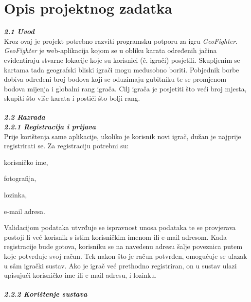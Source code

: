 \chapter{Opis projektnog zadatka}
		
		\textbf{\textit{\large 2.1 Uvod}}\\
		
		{Kroz ovaj je projekt potrebno razviti programsku potporu za igru  \emph{GeoFighter}. \emph{GeoFighter} je web-aplikacija kojom se u obliku karata određenih jačina evidentiraju stvarne lokacije koje su korisnici (č. igrači) posjetili. Skupljenim se kartama tada geografski bliski igrači mogu međusobno boriti. Pobjednik borbe dobiva određeni broj bodova koji se oduzimaju gubitniku te se promjenom bodova mijenja i globalni rang igrača. Cilj igrača je posjetiti što veći broj mjesta, skupiti što više karata i postići što bolji rang. } \\ \\
		
		
		\textbf{\textit{\large 2.2 Razrada }}\\ 
		
		\textbf{\textit{2.2.1 Registracija i prijava }}\\
		
		{Prije korištenja same aplikacije, ukoliko je korisnik novi igrač, dužan je najprije registrirati se. Za registraciju potrebni su:}
	
		\begin{packed_item}
			\item {korisničko ime,}
			\item {fotografija,}
			\item {lozinka,}
			\item {e-mail adresa.}
		\end{packed_item}
		
		{Validacijom podataka utvrđuje se ispravnost unosa podataka te se provjerava postoji li već korisnik s istim korisničkim imenom ili e-mail adresom. Kada registracije bude gotova, korisniku se na navedenu adresu šalje poveznica putem koje potvrđuje svoj račun. Tek nakon što je račun potvrđen, omogućuje se ulazak u sâm igrački sustav.}
		{Ako je igrač već prethodno registriran, on u sustav ulazi upisujući korisničko ime ili e-mail adresu, i lozinku.}\\ \\
		
		\textbf{\textit{2.2.2 Korištenje sustava}}\\
		
